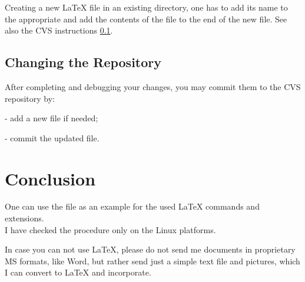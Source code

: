 \documentclass[12pt,letterpaper]{article}
\begin{document}
  Creating a new \LaTeX{} file in an existing directory,
  one has to add its name to the appropriate 
  and add the contents of the file 
  to the end of the new file. See also the CVS instructions
  \ref{sec:commit}.

\subsection{Changing the Repository}
\label{sec:commit}

  After completing and debugging your changes, you may commit them
  to the CVS repository by:\\
  \begin{list}{}{\setlength{\itemsep}{-0.15cm}}
    \item {} - add a new file if needed;
    \item {} - commit the updated file.
  \end{list}

\section{Conclusion}
\label{sec:conclusion}

  One can use the file  as an
  example for the used \LaTeX{} commands and extensions. \\

  I have checked the procedure only on the Linux platforms.

  In case you can not use \LaTeX{},
  please do not send me documents in proprietary MS formats, like Word,
  but rather send just a simple text file and pictures, which I can
  convert to \LaTeX{} and incorporate. 




\end{document}
